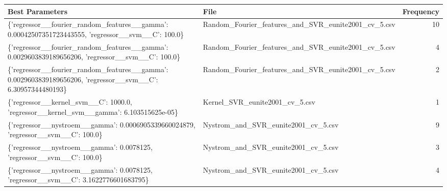 \begin{tabularx}{\textwidth}{llr}
\toprule
                                                                                            Best Parameters &                                                File &  Frequency \\
\midrule
          \{'regressor\_\_fourier\_random\_features\_\_gamma': 0.00042507351723443555, 'regressor\_\_svm\_\_C': 100.0\} & Random\_Fourier\_features\_and\_SVR\_eunite2001\_cv\_5.csv &         10 \\
           \{'regressor\_\_fourier\_random\_features\_\_gamma': 0.0029603839189656206, 'regressor\_\_svm\_\_C': 100.0\} & Random\_Fourier\_features\_and\_SVR\_eunite2001\_cv\_5.csv &          4 \\
\{'regressor\_\_fourier\_random\_features\_\_gamma': 0.0029603839189656206, 'regressor\_\_svm\_\_C': 6.30957344480193\} & Random\_Fourier\_features\_and\_SVR\_eunite2001\_cv\_5.csv &          2 \\
                      \{'regressor\_\_kernel\_svm\_\_C': 1000.0, 'regressor\_\_kernel\_svm\_\_gamma': 6.103515625e-05\} &                      Kernel\_SVR\_eunite2001\_cv\_5.csv &          1 \\
                          \{'regressor\_\_nystroem\_\_gamma': 0.0006905339660024879, 'regressor\_\_svm\_\_C': 100.0\} &                 Nystrom\_and\_SVR\_eunite2001\_cv\_5.csv &          9 \\
                                      \{'regressor\_\_nystroem\_\_gamma': 0.0078125, 'regressor\_\_svm\_\_C': 100.0\} &                 Nystrom\_and\_SVR\_eunite2001\_cv\_5.csv &          3 \\
                         \{'regressor\_\_nystroem\_\_gamma': 0.0078125, 'regressor\_\_svm\_\_C': 3.1622776601683795\} &                 Nystrom\_and\_SVR\_eunite2001\_cv\_5.csv &          4 \\
\bottomrule
\end{tabularx}
